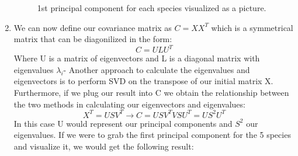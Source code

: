 \documentclass[11pt]{article}
\begin{document}
\begin{singlespace}
\begin{enumerate}
\begin{figure}[h]
    
    \caption{1st principal component for each species visualized as a picture.}
\end{figure}

\item We can now define our covariance matrix as $ C = XX^T $ which is a symmetrical matrix that can be diagonilized in the form: 
$$ C = ULU^T$$ 
Where U is a matrix of eigenvectors and L is a diagonal matrix with eigenvalues $\lambda_i$- Another approach to calculate the eigenvalues and eigenvectors is to perform SVD on the transpose of our initial matrix X. Furthermore, if we plug our result into C we obtain the relationship between the two methods in calculating our eigenvectors and eigenvalues:
$$ X^T = USV^T  \rightarrow C = USV^TVSU^T = US^2U^T$$
In this case U would represent our principal components and $S^2$ our eigenvalues. If we were to grab the first principal component for the 5 species and visualize it, we would get the following result: \\


\end{enumerate}
\end{singlespace}
\end{document}
